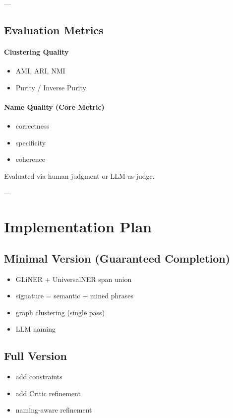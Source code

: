 \documentclass[14pt]{extreport}
\begin{document}
---

\subsection{Evaluation Metrics}

\paragraph{Clustering Quality}
\begin{itemize}
    \item AMI, ARI, NMI
    \item Purity / Inverse Purity
\end{itemize}

\paragraph{Name Quality (Core Metric)}
\begin{itemize}
    \item correctness
    \item specificity
    \item coherence
\end{itemize}

Evaluated via human judgment or LLM-as-judge.

---

\section{Implementation Plan}

\subsection{Minimal Version (Guaranteed Completion)}
\begin{itemize}
    \item GLiNER + UniversalNER span union
    \item signature = semantic + mined phrases
    \item graph clustering (single pass)
    \item LLM naming
\end{itemize}

\subsection{Full Version}
\begin{itemize}
    \item add constraints
    \item add Critic refinement
    \item naming-aware refinement
\end{itemize}
\end{document}
